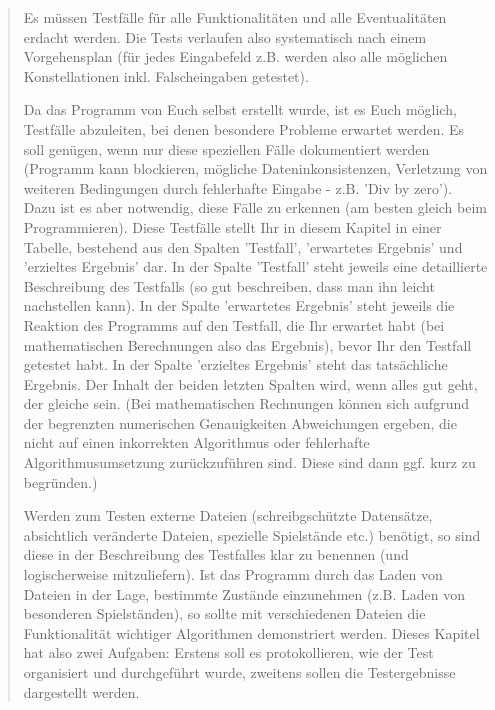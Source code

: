 \documentclass[12pt, letterpaper]{article}
\begin{document}
            \begin{verse}
                Es müssen Testfälle für alle Funktionalitäten und alle Eventualitäten erdacht werden. Die Tests verlaufen also systematisch nach einem Vorgehensplan (für jedes Eingabefeld z.B. werden also alle möglichen Konstellationen inkl. Falscheingaben getestet).

                Da das Programm von Euch selbst erstellt wurde, ist es Euch möglich, Testfälle abzuleiten, bei denen besondere Probleme erwartet werden. Es soll genügen, wenn nur diese speziellen Fälle dokumentiert werden (Programm kann blockieren, mögliche Dateninkonsistenzen, Verletzung von weiteren Bedingungen durch fehlerhafte Eingabe - z.B. 'Div by zero'). Dazu ist es aber notwendig, diese Fälle zu erkennen (am besten gleich beim Programmieren). 
                Diese Testfälle stellt Ihr in diesem Kapitel in einer Tabelle, bestehend aus den Spalten 'Testfall', 'erwartetes Ergebnis' und 'erzieltes Ergebnis' dar. In der Spalte 'Testfall' steht jeweils eine detaillierte Beschreibung des Testfalls (so gut beschreiben, dass man ihn leicht nachstellen kann). In der Spalte 'erwartetes Ergebnis' steht jeweils die Reaktion des Programms auf den Testfall, die Ihr erwartet habt (bei mathematischen Berechnungen also das Ergebnis), bevor Ihr den Testfall getestet habt. In der Spalte 'erzieltes Ergebnis' steht das tatsächliche Ergebnis. Der Inhalt der beiden letzten Spalten wird, wenn alles gut geht, der gleiche sein. (Bei mathematischen Rechnungen können sich aufgrund der begrenzten numerischen Genauigkeiten Abweichungen ergeben, die nicht auf einen inkorrekten Algorithmus oder fehlerhafte Algorithmusumsetzung zurückzuführen sind. Diese sind dann ggf. kurz zu begründen.) 
                
                Werden zum Testen externe Dateien (schreibgschützte Datensätze, absichtlich veränderte Dateien, spezielle Spielstände etc.) benötigt, so sind diese in der Beschreibung des Testfalles klar zu benennen (und logischerweise mitzuliefern). Ist das Programm durch das Laden von Dateien in der Lage, bestimmte Zustände einzunehmen (z.B. Laden von besonderen Spielständen), so sollte mit verschiedenen Dateien die Funktionalität wichtiger Algorithmen demonstriert werden.
                Dieses Kapitel hat also zwei Aufgaben: Erstens soll es protokollieren, wie der Test organisiert und durchgeführt wurde, zweitens sollen die Testergebnisse dargestellt werden.
            \end{verse}
        
\end{document}
